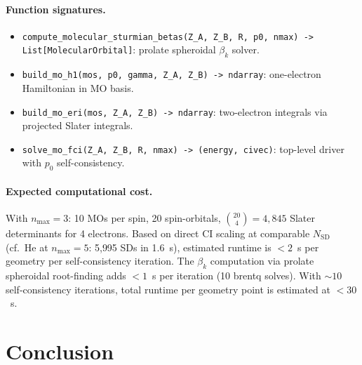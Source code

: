 \documentclass[aps,pra,twocolumn,superscriptaddress,longbibliography,floatfix]{revtex4-2}
\begin{document}
\paragraph{Function signatures.}
\begin{itemize}
\item \texttt{compute\_molecular\_sturmian\_betas(Z\_A, Z\_B, R, p0,
nmax) -> List[MolecularOrbital]}: prolate spheroidal $\beta_k$ solver.

\item \texttt{build\_mo\_h1(mos, p0, gamma, Z\_A, Z\_B) -> ndarray}:
one-electron Hamiltonian in MO basis.

\item \texttt{build\_mo\_eri(mos, Z\_A, Z\_B) -> ndarray}: two-electron
integrals via projected Slater integrals.

\item \texttt{solve\_mo\_fci(Z\_A, Z\_B, R, nmax) -> (energy, civec)}:
top-level driver with $p_0$ self-consistency.
\end{itemize}

\paragraph{Expected computational cost.}
With $n_{\max} = 3$: 10 MOs per spin, 20 spin-orbitals,
$\binom{20}{4} = 4{,}845$ Slater determinants for 4 electrons.
Based on direct CI scaling at comparable $N_{\text{SD}}$ (cf.\
He at $n_{\max} = 5$: 5{,}995 SDs in 1.6~s), estimated runtime
is $< 2$~s per geometry per self-consistency iteration.
The $\beta_k$ computation via prolate spheroidal root-finding adds
$< 1$~s per iteration (10 brentq solves).  With $\sim 10$
self-consistency iterations, total runtime per geometry point is
estimated at $< 30$~s.


\section{Conclusion}
\label{sec:conclusion}
\end{document}
